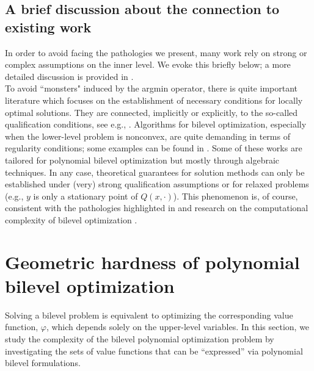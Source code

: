 \documentclass{article}
\newcommand{\valbilevel}{\varphi}
\newcommand{\jer}[1]{[[\textcolor{magenta}{#1}]]}
\theoremstyle{plain}
\theoremstyle{definition}
\begin{document}
\subsection*{A brief discussion about the connection to existing work}
{In order to avoid facing the  pathologies we present, many work rely on strong or complex assumptions on the inner level. We evoke this briefly below; a more detailed discussion is provided in . \\
 To avoid ``monsters" induced by the argmin operator, there is quite important literature which focuses on the establishment of necessary conditions for locally optimal solutions. They are connected, implicitly or explicitly, to the so-called qualification conditions, see e.g.,   \cite{ye1995optimality,dempe2012sensitivity,Mordukhovich2020,hendrion2011calmness,chen1995nonlinear}.  Algorithms for bilevel optimization, especially when the lower-level problem is nonconvex, are quite demanding in terms of regularity conditions; some examples can be found in \cite{liu2021towards,liu2021valuefunction,arbel:hal-03869097,liu2020generic, guihua2014solving}. Some of these works are tailored for polynomial bilevel optimization \cite{jeyakumar2016convergent,jiawang2017bilevel} but mostly through algebraic techniques. In any case,  theoretical guarantees for solution methods can only be established under (very) strong qualification assumptions or for relaxed problems (e.g., $y$ is only a stationary point of $Q(x, \cdot)$). This phenomenon is, of course, consistent with the pathologies highlighted in  and research on the computational complexity of bilevel optimization \cite{jeroslow1985polynomial,bard1991property,ben-ayed1990computational,lodi2013bilevel,caprara2014study}.}

\section{Geometric hardness of polynomial bilevel optimization}
\label{sec:geometricHardness}


Solving a bilevel problem is equivalent to optimizing the corresponding value function, $\valbilevel$, which depends solely on the upper-level variables. In this section, we study the complexity of the bilevel polynomial optimization problem by investigating the sets of value functions that can be ``expressed'' via polynomial bilevel formulations. 
\end{document}
